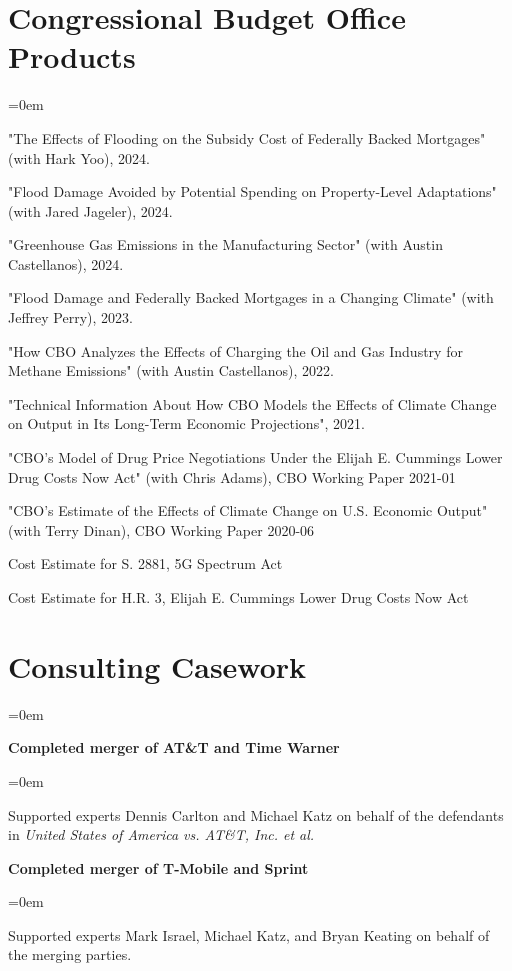 \documentclass[letterpaper]{article}
\renewenvironment{itemize}{
  \vspace{-0.5em}
  \begin{list}{}{
	\itemsep=0em
    \setlength{\leftmargin}{1.5em}
  }
}{
  \end{list}
}
\begin{document}
\section*{Congressional Budget Office Products}
\begin{itemize}
\item "The Effects of Flooding on the Subsidy Cost of Federally Backed Mortgages" (with Hark Yoo), 2024. 
\item "Flood Damage Avoided by Potential Spending on Property-Level Adaptations" (with Jared Jageler), 2024.
\item "Greenhouse Gas Emissions in the Manufacturing Sector" (with Austin Castellanos), 2024.
\item "Flood Damage and Federally Backed Mortgages in a Changing Climate" (with Jeffrey Perry), 2023.
\item "How CBO Analyzes the Effects of Charging the Oil and Gas Industry for Methane Emissions" (with Austin Castellanos), 2022.
\item "Technical Information About How CBO Models the Effects of Climate Change on Output in Its Long-Term Economic Projections", 2021.
\item "CBO’s Model of Drug Price Negotiations Under the Elijah E. Cummings Lower Drug Costs Now Act" (with Chris Adams), CBO Working Paper 2021-01
\item "CBO’s Estimate of the Effects of Climate Change on U.S. Economic Output" (with Terry Dinan), CBO Working Paper 2020-06
\item Cost Estimate for S. 2881, 5G Spectrum Act
\item Cost Estimate for H.R. 3, Elijah E. Cummings Lower Drug Costs Now Act
\end{itemize}

\section*{Consulting Casework}
\begin{itemize}
\item \textbf{Completed merger of AT\&T and Time Warner}
\begin{itemize}
\item Supported experts Dennis Carlton and Michael Katz on behalf of the defendants in \textit{United States of America vs. AT\&T, Inc. et al.}
\end{itemize}
\item \textbf{Completed merger of T-Mobile and Sprint}
\begin{itemize}
\item Supported experts Mark Israel, Michael Katz, and Bryan Keating on behalf of the merging parties.
\end{itemize}
\end{itemize}
\end{document}
